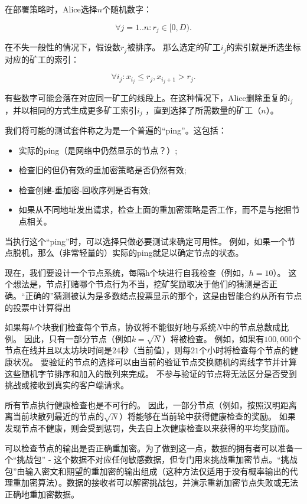\documentclass[longbibliography,nofootinbib]{revtex4-1}
\begin{document}
	在部署策略时，Alice选择$n$个随机数字：
    
\begin{equation}
    \forall j=1..n: r_j \in [0, D).
\end{equation}

	在不失一般性的情况下，假设数$r_j$被排序。 那么选定的矿工$i_j$的索引就是所选坐标对应的矿工的索引：

\begin{equation}
    \forall i_j: x_{i_j} \le r_j, x_{i_j + 1} > r_j.
\end{equation}

	有些数字可能会落在对应同一矿工的线段上。在这种情况下，Alice删除重复的$i_j$ ，并以相同的方式生成更多矿工索引$i_j$ ，直到选择了所需数量的矿工（$n$）。

	我们将可能的测试套件称之为是一个普遍的“ping”。这包括：
\begin{itemize}
    \item 实际的ping（是网络中仍然显示的节点？）;
    \item 检查旧的但仍有效的重加密策略是否仍然有效;
    \item 检查创建-重加密-回收序列是否有效;
    \item 如果从不同地址发出请求，检查上面的重加密策略是否工作，而不是与挖掘节点相关。
\end{itemize}
	当执行这个“ping”时，可以选择只做必要测试来确定可用性。 例如，如果一个节点脱机，那么（非常轻量的）实际的ping就足以确定节点的状态。
    
    
    现在，我们要设计一个节点系统，每隔h个块进行自我检查（例如，$h=10$）。 这个想法是，节点打赌哪个节点行为不当，挖矿奖励取决于他们的猜测是否正确。“正确的”猜测被认为是多数结点投票显示的那个，这是由智能合约从所有节点的投票中计算得出
    
    如果每$h$个块我们检查每个节点，协议将不能很好地与系统$N$中的节点总数成比例。 因此，只有一部分节点（例如$k=\sqrt{N}$）将被检查。 例如，如果有$100,000$个节点在线并且以太坊块时间是$24$秒（当前值），则每$21$个小时将检查每个节点的健康状况。 要验证的节点的选择可以由当前的验证节点交换随机的离线字节并计算这些随机字节排序和加入的散列来完成。 不参与验证的节点将无法区分是否受到挑战或接收到真实的客户端请求。

    所有节点执行健康检查也是不可行的。 因此，一部分节点（例如，按照汉明距离离当前块散列最近的节点的$\sqrt{N}$）将能够在当前轮中获得健康检查的奖励。 如果发现节点不健康，则会受到惩罚，失去自上次健康检查以来获得的平均奖励而。

    可以检查节点的输出是否正确重加密。为了做到这一点，数据的拥有者可以准备一个“挑战包” - 这个数据不对应任何敏感数据，但专门用来挑战重加密节点。“挑战包”由输入密文和期望的重加密的输出组成（这种方法仅适用于没有概率输出的代理重加密算法）。数据的接收者可以解密挑战包，并演示重新加密节点失败或无法正确地重加密数据。
\end{document}
